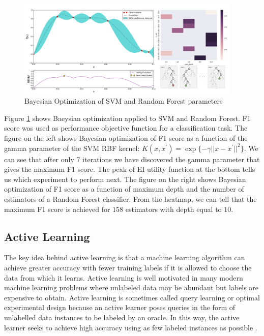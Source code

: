 \begin{figure}[tbhp]
    \centering
    \includegraphics[width=0.95\textwidth, trim={10 10 10 10}]{figures/bayes_opt.png}
    \caption{Bayesian Optimization of SVM and Random Forest parameters}
    \label{fig:bayes_opt}
\end{figure}

Figure \ref{fig:bayes_opt} shows Baeysian optimization applied to SVM and Random Forest. F1 score was used as performance objective function for a classification task. The figure on the left shows Bayesian optimization of F1 score as a function of the gamma parameter of the SVM RBF kernel: $K(x,x^{\prime}) = \exp\{-\gamma ||x-x^{\prime}||^{2}\}$. We can see that after only 7 iterations we have discovered the gamma parameter that gives the maximum F1 score. The peak of EI utility function at the bottom tells us which experiment to perform next. The figure on the right shows Bayesian optimization of F1 score as a function of maximum depth and the number of estimators of a Random Forest classifier. From the heatmap, we can tell that the maximum F1 score is achieved for $158$ estimators with depth equal to $10$.    


\subsection{Active Learning}

The key idea behind active learning is that a machine learning algorithm can achieve greater accuracy with fewer training labels if it is allowed to choose the data from which it learns. Active learning is well motivated in many modern machine learning problems where unlabeled data may be abundant but labels are expensive to obtain. Active learning is sometimes called query learning or optimal experimental design because an active learner poses queries in the form of unlabelled data instances to be labeled by an oracle. In this way, the active learner seeks to achieve high accuracy using as few labeled instances as possible \cite{Settles2009}.\\

